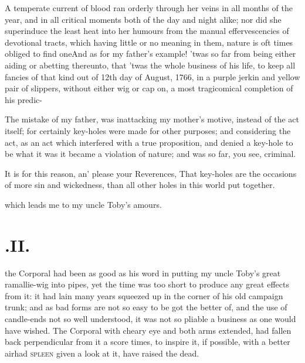 \documentclass{article}
\begin{document}
A temperate current of blood ran orderly through her veins in
all months of the year, and in all critical moments both
of the day and night alike; nor did she superinduce the least heat into her humours
from the manual effervescencies of devotional tracts, which having little or no
meaning in them, nature is oft times obliged to find one\tsh And as for my father’s
example!  ’twas so far from being either aiding or abetting thereunto, that ’twas
the whole business of his life, to keep all fancies of that kind out of\break
{}
12th day of
August, 1766, in a purple jerkin and yellow pair of slippers, without either
wig or cap on, a most tragicomical completion of his predic-\break
{} 

The mistake of my father, was in\break attacking my mother’s
motive, instead of the act itself; for certainly key-holes were
made for other purposes; and\break 
considering the act, as an act which\break
interfered with a true proposition, and\break
denied a key-hole to be what it was\break
\tsh it became a violation of nature; and was
so far, you see, criminal.

It is for this reason, an’ please your Reverences, That key-holes are
the occasions of more sin and wickedness, than all other holes in this world put
together.

\tsh which leads me to my uncle Toby’s
amours.

\vfill{}\eject
\null{}\baselineskip
\section{.\enspace II.}

 the Corporal had been as good
as his word in putting my uncle Toby’s great
ramallie-wig into pipes, yet the time was too short to produce any
great effects from it: it had lain many years squeezed up in the
corner of his old campaign trunk; and as bad forms are not so easy
to be got the better of, and the use of candle-ends not so well
understood, it was not so pliable a business as one would have
wished. The Corporal with cheary eye and both arms extended, had
fallen back perpendicular from it a score times, to inspire it, if
possible, with a better air\tsh had \textsc{spleen}
given a look at it,
have raised the dead.\etp
\end{document}
